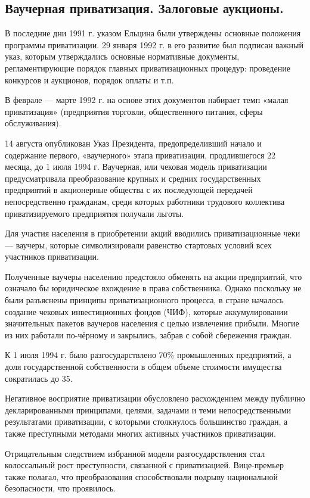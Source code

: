 \subsection{Ваучерная приватизация. Залоговые аукционы.}
В последние дни 1991 г. указом Ельцина были утверждены основные положения программы приватизации. 29 января 1992 г. в его развитие был подписан важный указ, которым утверждались основные нормативные документы, регламентирующие порядок главных приватизационных процедур: проведение конкурсов и аукционов, порядок оплаты и т.п.

В феврале — марте 1992 г. на основе этих документов набирает темп «малая приватизация» (предприятия торговли, общественного питания, сферы обслуживания).

14 августа опубликован Указ Президента, предопределивший начало и содержание первого, «ваучерного» этапа приватизации, продлившегося 22 месяца, до 1 июля 1994 г. Ваучерная, или чековая модель приватизации предусматривала преобразование крупных и средних государственных предприятий в акционерные общества с их последующей передачей непосредственно гражданам, среди которых работники трудового коллектива приватизируемого предприятия получали льготы.

Для участия населения в приобретении акций вводились приватизационные чеки — ваучеры, которые символизировали равенство стартовых условий всех участников приватизации.

Полученные ваучеры населению предстояло обменять на акции предприятий, что означало бы юридическое вхождение в права собственника. Однако поскольку не были разъяснены принципы приватизационного процесса, в стране началось создание чековых инвестиционных фондов (ЧИФ), которые аккумулировании значительных пакетов ваучеров населения с целью извлечения прибыли. Многие из них работали по-чёрному и закрылись, забрав с собой сбережения граждан.

К 1 июля 1994 г. было разгосударствлено 70\% промышленных предприятий, а доля государственной собственности в общем объеме стоимости имущества сократилась до 35.

Негативное восприятие приватизации обусловлено расхождением между публично декларированными принципами, целями, задачами и теми непосредственными результатами приватизации, с которыми столкнулось большинство граждан, а также преступными методами многих активных участников приватизации.

Отрицательным следствием избранной модели разгосударствления стал колоссальный рост преступности, связанной с приватизацией. Вице-премьер также полагал, что преобразования способствовали подрыву национальной безопасности, что проявилось.

